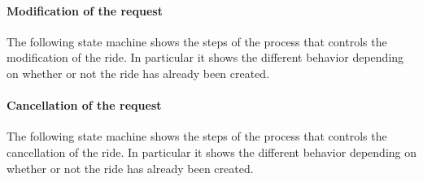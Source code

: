 \documentclass[a4paper,11pt]{report} %
\begin{document}
		\vspace*{1.1cm}
		
		\paragraph{Modification of the request} The following state machine shows the steps of the process that controls the modification of the ride. In particular it shows the different behavior depending on whether or not the ride has already been created.\\
		\noindent%
		\begin{minipage}{\linewidth}
		\end{minipage}	
		
		\pagebreak
		
		\paragraph{Cancellation of the request} The following state machine shows the steps of the process that controls the cancellation of the ride. In particular it shows the different behavior depending on whether or not the ride has already been created.\\
		\vspace*{1.1cm}
		
		\noindent%
		\begin{minipage}{\linewidth}
		\end{minipage}
		
\end{document}

